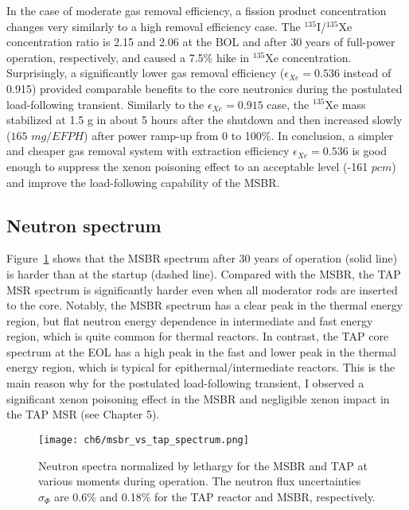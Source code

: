 In the case of moderate gas removal efficiency, a fission product 
concentration changes very similarly to a high removal efficiency case. The 
$^{135}$I/$^{135}$Xe concentration ratio is 2.15 and 2.06 at the \gls{BOL} and 
after 30 years of full-power operation, respectively, and caused a 7.5\% hike 
in $^{135}$Xe concentration. Surprisingly, a significantly lower gas removal 
efficiency ($\epsilon_{Xe}=0.536$ instead of 0.915) provided comparable 
benefits to the core neutronics during the postulated load-following 
transient. Similarly to the $\epsilon_{Xe}=0.915$ case, the 
$^{135}$Xe mass stabilized at 1.5 g in about 5 hours after the shutdown and 
then increased slowly ($165$ $mg/EFPH$) after power ramp-up from 0 to 100\%.
In conclusion, a simpler and cheaper gas removal system with extraction 
efficiency $\epsilon_{Xe}=0.536$ is good enough to suppress the xenon 
poisoning effect to an acceptable level (-161 $pcm$) and improve the 
load-following capability of the \gls{MSBR}.


\subsection{Neutron spectrum}
Figure~\ref{fig:ch6-msbr-spectrum} shows that the \gls{MSBR} spectrum after 30 
years of operation (solid line) is harder than at the startup (dashed line). 
Compared with the \gls{MSBR}, the \gls{TAP} \gls{MSR} spectrum is 
significantly harder even when all moderator rods are inserted to the core. 
Notably, the \gls{MSBR} spectrum has a clear peak in the thermal energy 
region, but flat neutron energy dependence in intermediate and fast energy 
region, which is quite common for thermal reactors. In contrast, the \gls{TAP} 
core spectrum at the \gls{EOL} has a high peak in the fast and lower peak in 
the thermal energy region, which is typical for epithermal/intermediate 
reactors. This is the main reason why for the postulated load-following 
transient, I observed a significant xenon poisoning effect in the \gls{MSBR} 
and negligible xenon impact in the \gls{TAP} \gls{MSR} (see Chapter 5).
\begin{figure}[htbp!] %
	\centering
	\texttt{[image: ch6/msbr\_vs\_tap\_spectrum.png]}
	\caption{Neutron spectra normalized by lethargy for the \gls{MSBR} and 
		\gls{TAP} at various moments during operation. The neutron flux 
		uncertainties $\sigma_{\Phi}$ are 0.6\% and 0.18\% for the \gls{TAP} 
		reactor and \gls{MSBR}, respectively.}
	\label{fig:ch6-msbr-spectrum}
\end{figure}

